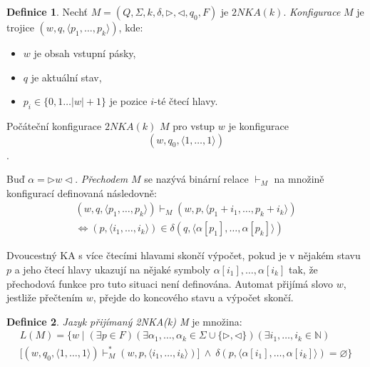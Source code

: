 \documentclass[thesis=B,czech]{FITthesis}[2019/12/23]
\theoremstyle{definition}
\newtheorem{definition}{Definice}[chapter]
\begin{document}
\begin{definition}
Nechť $M = \left(Q, \Sigma, k, \delta, \triangleright, \triangleleft, q_0, F\right)$ je $2NKA(k)$.
\emph{Konfigurace} $M$ je trojice $\left(w, q, \langle p_1, \dots, p_k\rangle\right)$, kde:
\begin{itemize}
	\item{$w$ je obsah vstupní pásky,}
	\item{$q$ je aktuální stav,}
	\item{$p_i \in \{0, 1 \dots |w|+1\}$ je pozice $i$-té čtecí hlavy.}
\end{itemize}

Počáteční konfigurace $2NKA(k)$ $M$ pro vstup $w$ je konfigurace $$\left(w, q_0, \langle 1, \dots, 1\rangle\right)$$.

Buď $\alpha = \triangleright w \triangleleft$. \emph{Přechodem} $M$ se nazývá binární relace $\vdash_M$ na množině konfigurací definovaná následovně:
\begin{equation*}
\begin{split}
\left(w, q, \langle p_1, \dots, p_k \rangle\right) \vdash_M
\left(w, p,  \langle p_1+i_1, \dots, p_k+i_k \rangle \right) \\
\iff \left(p, \langle i_1, \dots, i_k \rangle \right) \in \delta\left(q, \langle \alpha[p_1], \dots, \alpha[p_k] \rangle \right)
\end{split}
\end{equation*}
\end{definition}

Dvoucestný KA s více čtecími hlavami skončí výpočet, pokud je v nějakém stavu $p$ a jeho čtecí hlavy ukazují na nějaké symboly $\alpha[i_1], \dots, \alpha[i_k]$ tak, že přechodová funkce pro tuto situaci není definována. Automat přijímá slovo $w$, jestliže přečtením $w$, přejde do koncového stavu a výpočet skončí.

\begin{definition}
\emph{Jazyk přijímaný 2NKA(k) M} je množina: 
\begin{equation*}
	\begin{split}
L\left(M\right) = \{ w \mid \left(\exists p \in F \right)  \left(\exists \alpha_1,\dots, \alpha_{k} \in \Sigma\cup\{\triangleright, \triangleleft\} \right) \left(\exists i_1, \dots, i_{k} \in \mathbb{N} \right) \\ 
\Big [ \left(w, q_0, \langle1, \dots, 1\rangle\right) \vdash_M^{\ast} \left(w, p, \langle i_1, \dots, i_k\rangle \right) \Big ] \ \wedge \ \delta(p, \langle \alpha[i_1], \dots, \alpha[i_k] \rangle) = \varnothing \}
\end{split}
\end{equation*}
\end{definition}
\end{document}

